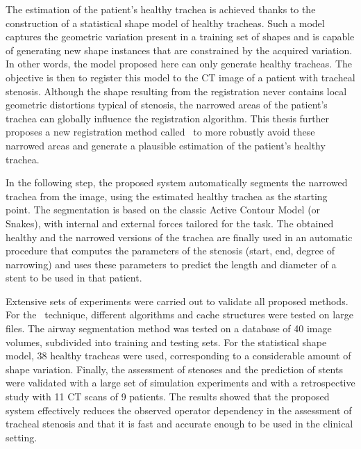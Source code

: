 \medskip

The estimation of the patient's healthy trachea is achieved thanks to the construction of a statistical shape model of healthy tracheas. Such a model captures the geometric variation present in a training set of shapes and is capable of generating new shape instances that are constrained by the acquired variation. In other words, the model proposed here can only generate healthy tracheas. The objective is then to register this model to the CT image of a patient with tracheal stenosis. Although the shape resulting from the registration never contains local geometric distortions typical of stenosis, the narrowed areas of the patient's trachea can globally influence the registration algorithm. This thesis further proposes a new registration method called \fixedland\ to more robustly avoid these narrowed areas and generate a plausible estimation of the patient's healthy trachea.

\medskip

In the following step, the proposed system automatically segments the narrowed trachea from the image, using the estimated healthy trachea as the starting point. The segmentation is based on the classic Active Contour Model (or Snakes), with internal and external forces tailored for the task. The obtained healthy and the narrowed versions of the trachea are finally used in an automatic procedure that computes the parameters of the stenosis (start, end, degree of narrowing) and uses these parameters to predict the length and diameter of a stent to be used in that patient. 

\medskip

Extensive sets of experiments were carried out to validate all proposed methods. For the \outcore\ technique, different algorithms and cache structures were tested on large files. The airway segmentation method was tested on a database of 40 image volumes, subdivided into training and testing sets. For the statistical shape model, 38 healthy tracheas were used, corresponding to a considerable amount of shape variation. Finally, the assessment of stenoses and the prediction of stents were validated with a large set of simulation experiments and with a retrospective study with 11 CT scans of 9 patients. The results showed that the proposed system effectively reduces the observed operator dependency in the assessment of tracheal stenosis and that it is fast and accurate enough to be used in the clinical setting.




